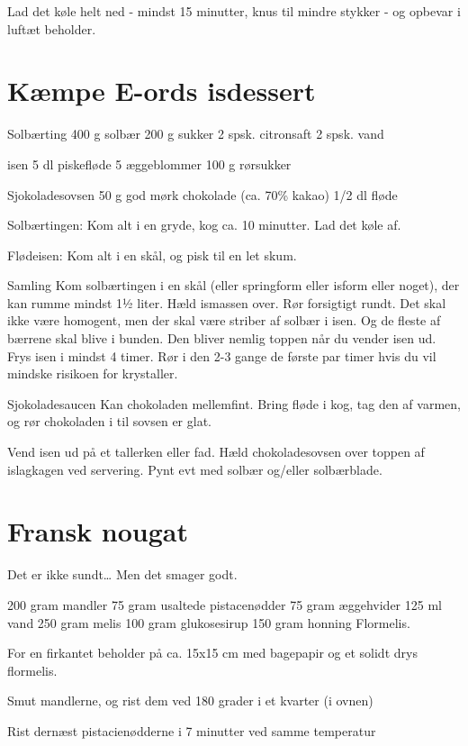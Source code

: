 \documentclass[
]{book}
\begin{document}
Lad det køle helt ned - mindst 15 minutter, knus til mindre stykker - og opbevar i luftæt beholder.

\section{Kæmpe E-ords isdessert}\label{kuxe6mpe-e-ords-isdessert}

Solbærting
400 g solbær
200 g sukker
2 spsk. citronsaft
2 spsk. vand

isen
5 dl piskefløde
5 æggeblommer
100 g rørsukker

Sjokoladesovsen
50 g god mørk chokolade (ca. 70\% kakao)
1/2 dl fløde

Solbærtingen:
Kom alt i en gryde, kog ca. 10 minutter. Lad det køle af.

Flødeisen:
Kom alt i en skål, og pisk til en let skum.

Samling
Kom solbærtingen i en skål (eller springform eller isform eller noget), der kan rumme
mindst 1½ liter. Hæld ismassen over. Rør forsigtigt rundt. Det skal ikke være
homogent, men der skal være striber af solbær i isen. Og de fleste af bærrene
skal blive i bunden. Den bliver nemlig toppen når du vender isen ud.
Frys isen i mindst 4 timer. Rør i den 2-3 gange de første par timer
hvis du vil mindske risikoen for krystaller.

Sjokoladesaucen
Kan chokoladen mellemfint. Bring fløde i kog, tag den af varmen, og rør
chokoladen i til sovsen er glat.

Vend isen ud på et tallerken eller fad. Hæld chokoladesovsen over toppen af
islagkagen ved servering. Pynt evt med solbær og/eller solbærblade.

\section{Fransk nougat}\label{fransk-nougat}

Det er ikke sundt\ldots{} Men det smager godt.

200 gram mandler
75 gram usaltede pistacenødder
75 gram æggehvider
125 ml vand
250 gram melis
100 gram glukosesirup
150 gram honning
Flormelis.

For en firkantet beholder på ca. 15x15 cm med bagepapir og et solidt drys flormelis.

Smut mandlerne, og rist dem ved 180 grader i et kvarter (i ovnen)

Rist dernæst pistacienødderne i 7 minutter ved samme temperatur
\end{document}
